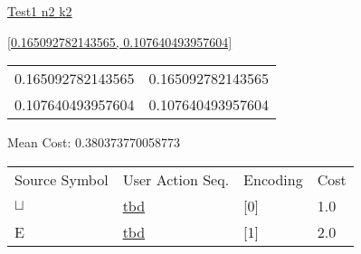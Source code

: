 \documentclass[12pt]{article}
\begin{document}
\noindent \url{Test1 n2 k2}

\noindent \url{[0.165092782143565, 0.107640493957604]}

\noindent\begin{tt}
\begin{small}
\begin{bundle}{}
\end{bundle}
\end{small}
\end{tt}
\newpage%
\begin{tabular}{l l}0.165092782143565	&	0.165092782143565\\
0.107640493957604	&	0.107640493957604\\
\end{tabular}\newpage
\noindent
\noindent Mean Cost: 0.380373770058773\\
\begin{tabular}{l l l l}
Source Symbol	&	User Action Seq.	&	Encoding	&	Cost\\
$\sqcup$	&	\url{tbd}	&	[0]	&	1.0\\
E	&	\url{tbd}	&	[1]	&	2.0\\
\end{tabular}
\end{document}

